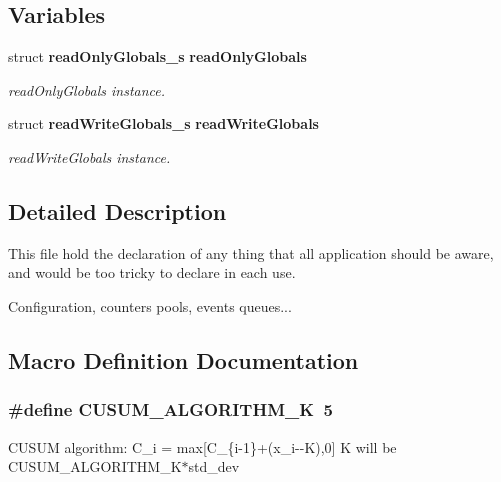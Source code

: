 \subsection*{Variables}
\begin{DoxyCompactItemize}
\item 
struct {\bf read\+Only\+Globals\+\_\+s} {\bf read\+Only\+Globals}
\begin{DoxyCompactList}\small\item\em read\+Only\+Globals instance. \end{DoxyCompactList}\item 
struct {\bf read\+Write\+Globals\+\_\+s} {\bf read\+Write\+Globals}
\begin{DoxyCompactList}\small\item\em read\+Write\+Globals instance. \end{DoxyCompactList}\end{DoxyCompactItemize}


\subsection{Detailed Description}
This file hold the declaration of any thing that all application should be aware, and would be too tricky to declare in each use. 

Configuration, counters pools, events queues... 

\subsection{Macro Definition Documentation}
\subsubsection[{C\+U\+S\+U\+M\+\_\+\+A\+L\+G\+O\+R\+I\+T\+H\+M\+\_\+\+K}]{\setlength{\rightskip}{0pt plus 5cm}\#define C\+U\+S\+U\+M\+\_\+\+A\+L\+G\+O\+R\+I\+T\+H\+M\+\_\+\+K~5}\label{global_8h_a84152aad386537505d9470c65d08e554}
C\+U\+S\+U\+M algorithm\+: C\+\_\+i = max[C\+\_\+\{i-\/1\}+(x\+\_\+i-\/-\/\+K),0] K will be C\+U\+S\+U\+M\+\_\+\+A\+L\+G\+O\+R\+I\+T\+H\+M\+\_\+\+K$\ast$std\+\_\+dev 

